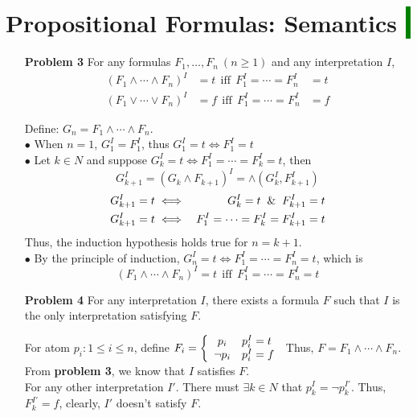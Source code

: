 \documentclass[12pt]{article}
\begin{document}
\section{Propositional Formulas: Semantics \colorbox{green}{$~$ }}
\begin{enumerate}
\item[\textbf{Problem 3}] For any formulas $F_1, \ldots, F_n~(n \geq 1)$ and any interpretation $I$, 
\begin{eqnarray*}
 (F_1 \wedge \cdots \wedge F_n)^I &= t~~ \text{iff} ~~ F_1^I = \cdots = F_n^I &= t  \\
 (F_1 \vee \cdots \vee F_n)^I &= f~~ \text{iff} ~~ F_1^I = \cdots = F_n^I &= f 
\end{eqnarray*}

\noindent
Define: $G_n = F_1 \wedge \cdots \wedge F_n$. \\
$\bullet$ When $n = 1$, $G_1^I = F_1^I$, thus $G_1^I = t \iff F_1^I = t$  \\
$\bullet$ Let $k \in N$ and suppose $G_k^I = t \iff F_1^I = \cdots = F_k^I = t$, then
\begin{equation*}
    G_{k+1}^I = \left(G_k \wedge F_{k+1} \right)^I = \wedge \left(G_k^I, F_{k+1}^I \right)
\end{equation*}
\vspace{-30pt}
\begin{eqnarray*}
    G_{k+1}^I = t &\iff &G_k^I = t \And F_{k+1}^I = t  \\
    G_{k+1}^I = t &\iff & F_1^I = \cdots = F_k^I = F_{k+1}^I = t
\end{eqnarray*}
\hspace{10pt}Thus, the induction hypothesis holds true for $n = k+1$. \\
$\bullet$ By the principle of induction, $G_n^I = t \iff F_1^I = \cdots = F_n^I = t$, which is \\
\begin{equation*}
(F_1 \wedge \cdots \wedge F_n)^I = t~~ \text{iff} ~~ F_1^I = \cdots = F_n^I = t
\end{equation*}

\item[\textbf{Problem 4}] For any interpretation $I$, there exists a formula $F$ such that $I$ is the only interpretation satisfying $F$. 

For atom $p_i : 1 \leq i \leq n$, define 
$F_i=\left\{
    \begin{array}{c l}      
    p_i & p_i^I = t\\
    \neg p_i & p_i^I = f
\end{array}\right.$
Thus, $F = F_1 \wedge \cdots \wedge F_n$. \\
From \textbf{problem 3}, we know that $I$ satisfies $F$. \\
For any other interpretation $I'$. There must $\exists k \in N$ that $p_k^{I} = \neg p_k^{I'}$. Thus, $F_k^{I'} = f$, clearly, $I'$ doesn't satisfy $F$. 



\end{enumerate}
\end{document}

